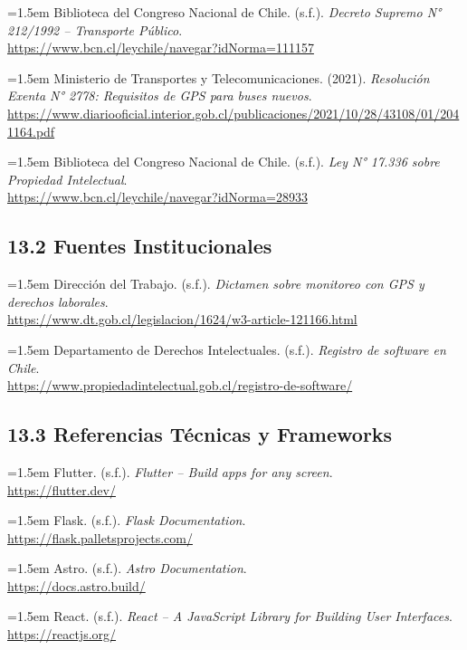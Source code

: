 \documentclass[12pt]{article}
\begin{document}
\hangindent=1.5em
Biblioteca del Congreso Nacional de Chile. (s.f.). \textit{Decreto Supremo N° 212/1992 – Transporte Público}.\\
\url{https://www.bcn.cl/leychile/navegar?idNorma=111157}

\hangindent=1.5em
Ministerio de Transportes y Telecomunicaciones. (2021). \textit{Resolución Exenta N° 2778: Requisitos de GPS para buses nuevos}.\\
\url{https://www.diariooficial.interior.gob.cl/publicaciones/2021/10/28/43108/01/2041164.pdf}

\hangindent=1.5em
Biblioteca del Congreso Nacional de Chile. (s.f.). \textit{Ley N° 17.336 sobre Propiedad Intelectual}.\\
\url{https://www.bcn.cl/leychile/navegar?idNorma=28933}

\vspace{1.5em}
\subsection{13.2 \hspace{0.5em} Fuentes Institucionales}
\hangindent=1.5em
Dirección del Trabajo. (s.f.). \textit{Dictamen sobre monitoreo con GPS y derechos laborales}.\\
\url{https://www.dt.gob.cl/legislacion/1624/w3-article-121166.html}

\hangindent=1.5em
Departamento de Derechos Intelectuales. (s.f.). \textit{Registro de software en Chile}.\\
\url{https://www.propiedadintelectual.gob.cl/registro-de-software/}

\vspace{1.5em}
\subsection{13.3 \hspace{0.5em} Referencias Técnicas y Frameworks}
\hangindent=1.5em
Flutter. (s.f.). \textit{Flutter – Build apps for any screen}.\\
\url{https://flutter.dev/}

\hangindent=1.5em
Flask. (s.f.). \textit{Flask Documentation}.\\
\url{https://flask.palletsprojects.com/}

\hangindent=1.5em
Astro. (s.f.). \textit{Astro Documentation}.\\
\url{https://docs.astro.build/}

\hangindent=1.5em
React. (s.f.). \textit{React – A JavaScript Library for Building User Interfaces}.\\
\url{https://reactjs.org/}
\end{document}
